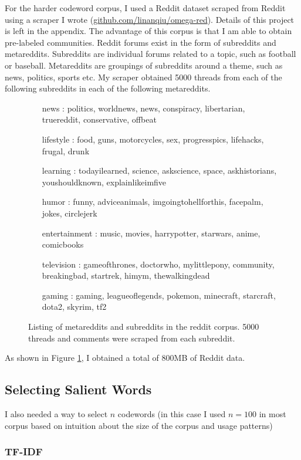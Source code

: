 For the harder codeword corpus, I used a Reddit dataset scraped from Reddit using a scraper I wrote (\url{github.com/linanqiu/omega-red}). Details of this project is left in the appendix. The advantage of this corpus is that I am able to obtain pre-labeled communities. Reddit forums exist in the form of subreddits and metareddits. Subreddits are individual forums related to a topic, such as football or baseball. Metareddits are groupings of subreddits around a theme, such as news, politics, sports etc. My scraper obtained 5000 threads from each of the following subreddits in each of the following metareddits.

\begin{figure}[h]
\begin{itemize}
\item[news]: politics, worldnews, news, conspiracy, libertarian, truereddit, conservative, offbeat
\item[lifestyle]: food, guns, motorcycles, sex, progresspics, lifehacks, frugal, drunk
\item[learning]: todayilearned, science, askscience, space, askhistorians, youshouldknown, explainlikeimfive
\item[humor]: funny, adviceanimals, imgoingtohellforthis, facepalm, jokes, circlejerk
\item[entertainment]: music, movies, harrypotter, starwars, anime, comicbooks
\item[television]: gameofthrones, doctorwho, mylittlepony, community, breakingbad, startrek, himym, thewalkingdead
\item[gaming]: gaming, leagueoflegends, pokemon, minecraft, starcraft, dota2, skyrim, tf2
\end{itemize}
\caption{Listing of metareddits and subreddits in the reddit corpus. 5000 threads and comments were scraped from each subreddit.}
\label{fig-reddit-corpus}
\end{figure}

As shown in Figure \ref{fig-reddit-corpus}, I obtained a total of 800MB of Reddit data.

\subsection{Selecting Salient Words}

I also needed a way to select $n$ codewords (in this case I used $n = 100$ in most corpus based on intuition about the size of the corpus and usage patterns)

\subsubsection{TF-IDF}

